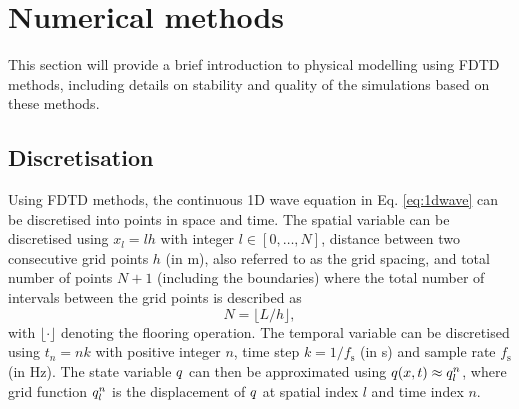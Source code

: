 \section{Numerical methods}\label{sec:FDTD}
This section will provide a brief introduction to physical modelling using FDTD methods, including details on stability and quality of the simulations based on these methods.

\subsection{Discretisation}
Using FDTD methods, the continuous 1D wave equation in Eq. \eqref{eq:1dwave} can be discretised into points in space and time. The spatial variable can be discretised using $x_l = lh$ %
with integer $l \in [0, \hdots, N]$, distance between two consecutive grid points $h$ (in m), also referred to as the grid spacing, and total number of points $N + 1$ (including the boundaries) where the total number of intervals between the grid points is described as
\begin{equation}\label{eq:numberOfIntervals}
    N = \lfloor L/h\rfloor,
\end{equation}
with $\lfloor \cdot \rfloor$ denoting the flooring operation. The temporal variable can be discretised using $t_n = nk$ with positive integer $n$, time step $k = 1/f_\text{s}$ (in s) and sample rate $f_\text{s}$ (in Hz). The state variable $q$ can then be approximated using $q(x,t) \approx q_l^n$, where grid function $q_l^n$ is the displacement of $q$ at spatial index $l$ and time index $n$. %

